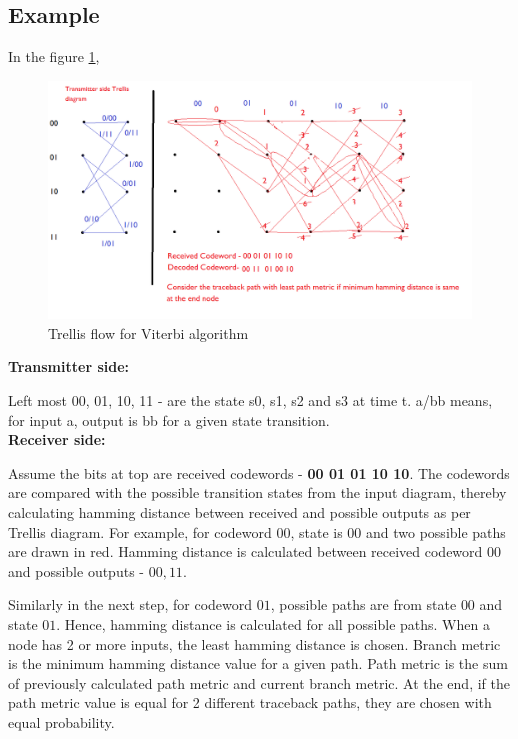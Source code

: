 \subsection{Example}
In the figure \ref{fig:Trellis},
\begin{normalsize}
\begin{figure}[ht]
	\centering
	\includegraphics[width=1\columnwidth]{figs/Trellis_navic.png}
	\centering
	\captionsetup{justification=centering}
	\caption{Trellis flow for Viterbi algorithm}
	\label{fig:Trellis}
\end{figure}
\end{normalsize}


\textbf{Transmitter side:} 

\noindent Left most 00, 01, 10, 11 - are the state s0, s1, s2 and s3 at time t. a/bb means, for input a, output is bb for a given state transition.
\\
\textbf{Receiver side:} 

\noindent Assume the bits at top are received codewords - \textbf{00 01 01 10 10}. The codewords are compared with the possible transition states from the input diagram, thereby calculating hamming distance between received and possible outputs as per Trellis diagram. For example, for codeword $00$, state is $00$ and two possible paths are drawn in red. Hamming distance is calculated between received codeword $00$ and possible outputs - $00, 11$.

\noindent Similarly in the next step, for codeword $01$, possible paths are from state $00$ and state $01$. Hence, hamming distance is calculated for all possible paths. When a node has 2 or more inputs, the least hamming distance is chosen. Branch metric is the minimum hamming distance value for a given path. Path metric is the sum of previously calculated path metric and current branch metric. At the end, if the path metric value is equal for 2 different traceback paths, they are chosen with equal probability.

